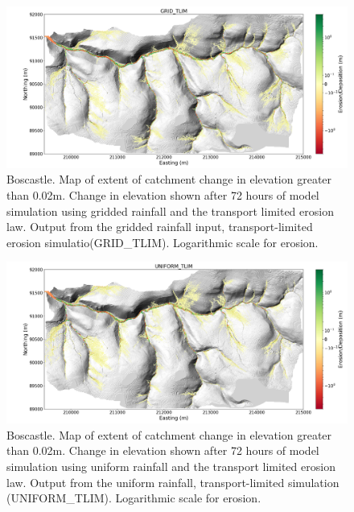 \begin{figure}
\includegraphics[width=25cm]{chp06_figures_scripts/boscastle_erodediff_grid_tlim.png}
\caption{Boscastle. Map of extent of catchment change in elevation greater than 0.02m. Change in elevation shown after 72 hours of model simulation using gridded rainfall and the transport limited erosion law. Output from the gridded rainfall input, transport-limited erosion simulatio(GRID\_TLIM). Logarithmic scale for erosion.}
\label{fig_boscastle_erodediff_grid_tlim}
\end{figure}

\begin{figure}
\includegraphics[width=25cm]{chp06_figures_scripts/boscastle_erodediff_uniform_tlim.png}
\caption{Boscastle. Map of extent of catchment change in elevation greater than 0.02m. Change in elevation shown after 72 hours of model simulation using uniform rainfall and the transport limited erosion law. Output from the uniform rainfall, transport-limited simulation (UNIFORM\_TLIM). Logarithmic scale for erosion.}
\label{fig_boscastle_erodediff_uniform_tlim}
\end{figure}

